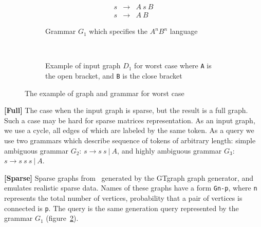 \begin{figure}[h]
    \centering
    \begin{subfigure}[b]{0.20\textwidth}
        \centering
        \[
         \begin{array}{rcl}
           s & \rightarrow & A \ s \ B \\
           s & \rightarrow & A \ B
         \end{array}
         \]
        \caption{Grammar $G_1$ which specifies the $A^n B^n$ language}
    \end{subfigure}%
    ~\quad
    \begin{subfigure}[b]{0.24\textwidth}
        \centering

        \caption{Example of input graph $D_1$ for worst case where \texttt{A} is the open bracket, and \texttt{B} is the close bracket}
        \label{fig:worstCaseGraph}
    \end{subfigure}%
    \caption{The example of graph and grammar for worst case}
    \label{fig:grammar_example}
\end{figure}


\textbf{[Full]} The case when the input graph is sparse, but the result is a full graph.
Such a case may be hard for sparse matrices representation.
As an input graph, we use a cycle, all edges of which are labeled by the same token.
As a query we use two grammars which describe sequence of tokens of arbitrary length: simple ambiguous grammar $G_2$: $s \rightarrow  s \ s \ | \ A$,  and highly ambiguous grammar $G_3$: $s \rightarrow s \ s \ s \ | \ A$.

\textbf{[Sparse]} Sparse graphs from~\cite{fan2018scaling} generated by the GTgraph graph generator, and emulates realistic sparse data.
Names of these graphs have a form \texttt{Gn-p}, where \texttt{n} represents the total number of vertices, probability that a pair of vertices is connected is \texttt{p}.
The query is the same generation query represented by the grammar $G_1$ (figure~\ref{fig:grammar_example}).
